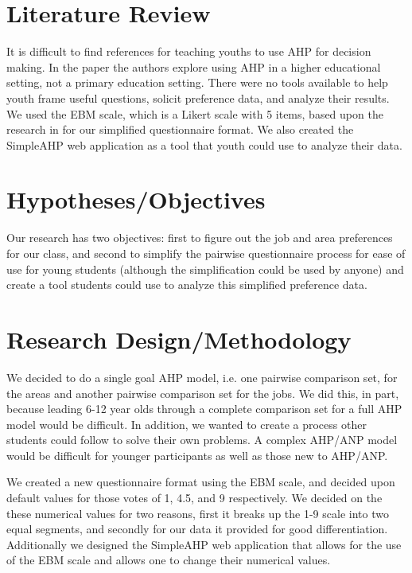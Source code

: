 \documentclass[11pt]{article}
\begin{document}
\section{Literature Review}
It is difficult to find references for teaching youths to use AHP for
decision making.  In the paper \citep{ref1} the authors explore
using AHP in a higher educational setting, not a primary education setting.
There were no tools available to help youth frame useful questions, solicit
preference data, and analyze their results.  
We used the EBM scale, which is a Likert scale with 5 items, based upon
the research in \citep{matell1971there} for our simplified questionnaire format.
We also created the SimpleAHP web application as a tool that youth
could use to analyze their data.

\section{Hypotheses/Objectives}
Our research has two objectives: first to figure out the job and area
preferences for our class, and second to simplify the pairwise 
questionnaire process for ease of use for young students (although
the simplification could be used by anyone) and create a tool students
could use to analyze this simplified preference data.



\section{Research Design/Methodology}
We decided to do a single goal AHP model, i.e. one pairwise comparison set,
for the areas and another pairwise comparison set for the jobs.  We did this, in part, because
leading 6-12 year olds through a complete comparison set for a full AHP model would be
difficult.  In addition, we wanted to create a process other students could follow to
solve their own problems.   A complex AHP/ANP model would be difficult for younger participants
as well as those new to AHP/ANP.

We created a new questionnaire format using the EBM scale, and
decided upon default values for those votes of 1, 4.5, and 9 respectively.  We decided 
on the these numerical values for two reasons, first it breaks up the 1-9 scale into two equal
segments, and secondly for our data it provided for good differentiation.  Additionally we
designed the SimpleAHP web application that allows for the use of the EBM scale and
allows one to change their numerical values.
\end{document}
